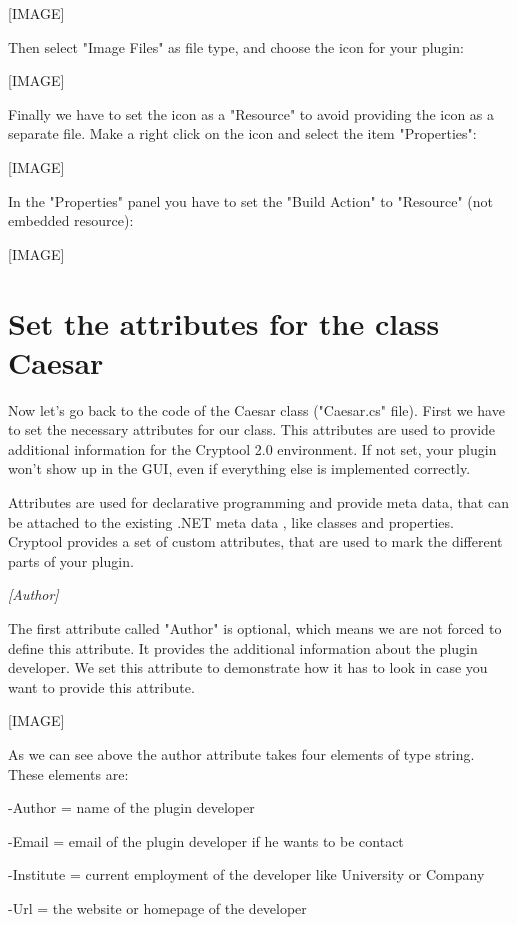 [IMAGE]

Then select "Image Files" as file type, and choose the icon for your plugin:

[IMAGE]

Finally we have to set the icon as a "Resource" to avoid providing the icon as a separate file. Make a right click on the icon and select the item "Properties":

[IMAGE]

In the "Properties" panel you have to set the "Build Action" to "Resource" (not embedded resource):

[IMAGE]


\section{Set the attributes for the class Caesar}\label{sec:SetTheAttributesForTheClassMD5}
Now let's go back to the code of the Caesar class ("Caesar.cs" file). First we have to set the necessary attributes for our class. This attributes are used to provide additional information for the Cryptool 2.0 environment. If not set, your plugin won't show up in the GUI, even if everything else is implemented correctly.

Attributes are used for declarative programming and provide meta data, that can be attached to the existing .NET meta data , like classes and properties. Cryptool provides a set of custom attributes, that are used to mark the different parts of your plugin.

\textit{[Author]}

The first attribute called "Author" is optional, which means we are not forced to define this attribute. It provides the additional information about the plugin developer. We set this attribute to demonstrate how it has to look in case you want to provide this attribute.

[IMAGE]

As we can see above the author attribute takes four elements of type string. These elements are:

\hspace{20pt}-Author = name of the plugin developer

\hspace{20pt}-Email = email of the plugin developer if he wants to be contact

\hspace{20pt}-Institute = current employment of the developer like University or Company

\hspace{20pt}-Url = the website or homepage of the developer

